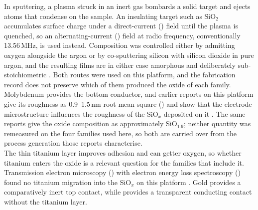 \noindent In sputtering, a plasma struck in an inert gas bombards a solid target and ejects atoms that condense on
the sample. An insulating target such as SiO$_2$ accumulates surface charge under a direct-current
() field until the plasma is quenched, so an alternating-current () field at radio
frequency, conventionally 13.56\,MHz, is used instead. Composition was controlled either by admitting oxygen
alongside the argon or by co-sputtering silicon with silicon dioxide in pure argon, and the resulting films are in
either case amorphous and deliberately sub-stoichiometric
\cite{mehonic2012electrically, munde2017intrinsic}. Both routes were used on this platform, and the
fabrication record does not preserve which of them produced the oxide of each family.\\

\noindent Molybdenum provides the bottom conductor, and earlier reports on this platform give its roughness as
0.9--1.5\,nm root mean square () and show that the electrode microstructure influences the roughness
of the SiO$_x$ deposited on it \cite{kenyon2019interplay}. The same reports give the oxide composition as
approximately SiO$_{1.9}$; neither quantity was remeasured on the four families used here, so both are carried over
from the process generation those reports characterise.\\

\noindent The thin titanium layer improves adhesion and can getter oxygen, so whether titanium enters the oxide is a
relevant question for the families that include it. Transmission electron microscopy () with electron
energy loss spectroscopy () found no titanium migration into the SiO$_x$ on this platform
\cite{mehonic2017intrinsic}. Gold provides a comparatively inert top contact, while  provides a
transparent conducting contact without the titanium layer.\\

